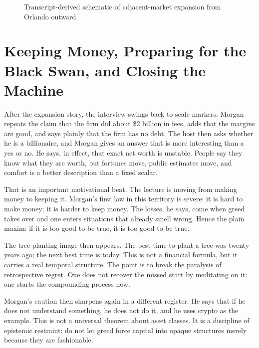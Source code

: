 \begin{figure}
\centering
{}
\caption{Transcript-derived schematic of adjacent-market expansion from Orlando outward.}
\label{fig:brick-scale-refined}
\end{figure}

\section{Keeping Money, Preparing for the Black Swan, and Closing the Machine}

After the expansion story, the interview swings back to scale markers. Morgan repeats the claim that the firm did about \$2 billion in fees, adds that the margins are good, and says plainly that the firm has no debt. The host then asks whether he is a billionaire, and Morgan gives an answer that is more interesting than a yes or no. He says, in effect, that exact net worth is unstable. People say they know what they are worth, but fortunes move, public estimates move, and comfort is a better description than a fixed scalar.

That is an important motivational beat. The lecture is moving from making money to keeping it. Morgan's first law in this territory is severe: it is hard to make money; it is harder to keep money. The losses, he says, come when greed takes over and one enters situations that already smell wrong. Hence the plain maxim: if it is too good to be true, it is too good to be true.

The tree-planting image then appears. The best time to plant a tree was twenty years ago; the next best time is today. This is not a financial formula, but it carries a real temporal structure. The point is to break the paralysis of retrospective regret. One does not recover the missed start by meditating on it; one starts the compounding process now.

Morgan's caution then sharpens again in a different register. He says that if he does not understand something, he does not do it, and he uses crypto as the example. This is not a universal theorem about asset classes. It is a discipline of epistemic restraint: do not let greed force capital into opaque structures merely because they are fashionable.

